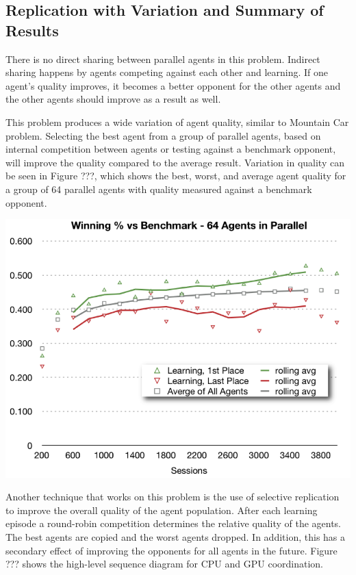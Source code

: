 \documentclass[11pt]{article} %
\begin{document}
\begin{flushleft}



\subsection{Replication with Variation and Summary of Results}
There is no direct sharing between parallel agents in this problem.  Indirect sharing happens by agents competing against each other and learning.  If one agent’s quality improves, it becomes a better opponent for the other agents and the other agents should improve as a result as well.

This problem produces a wide variation of agent quality, similar to Mountain Car problem.  Selecting the best agent from a group of parallel agents, based on internal competition between agents or testing against a benchmark opponent, will improve the quality compared to the average result.  Variation in quality can be seen in Figure ???, which shows the best, worst, and average agent quality for a group of 64 parallel agents with quality measured against a benchmark opponent.

\end{flushleft}
\center
\includegraphics[scale=0.8]{fig18}
\begin{flushleft}


Another technique that works on this problem is the use of selective replication to improve the overall quality of the agent population.  After each learning episode a round-robin competition determines the relative quality of the agents.  The best agents are copied and the worst agents dropped.  In addition, this has a secondary effect of improving the opponents for all agents in the future.  Figure ??? shows the high-level sequence diagram for CPU and GPU coordination.

\end{flushleft}
\end{document}
